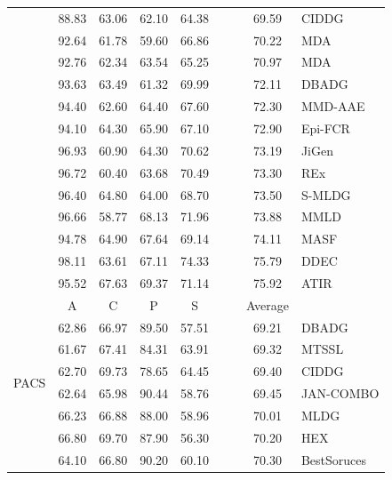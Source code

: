 \documentclass{article}
\begin{document}
\begin{table}
\begin{center}
\begin{small}
{\begin{tabular}{p{1.5cm}cccccccl}
& 88.83 & 63.06 & 62.10 & 64.38 &       &       & 69.59 & CIDDG \citep{li2018deep}\\
& 92.64 & 61.78 & 59.60 & 66.86 &       &       & 70.22 & MDA \citep{hu2019domain}\\
& 92.76 & 62.34 & 63.54 & 65.25 &       &       & 70.97 & MDA \citep{ding2017deep}\\
& 93.63 & 63.49 & 61.32 & 69.99 &       &       & 72.11 & DBADG \citep{Li_2017_ICCV}\\
& 94.40 & 62.60 & 64.40 & 67.60 &       &       & 72.30 & MMD-AAE \citep{li2018domain}\\
& 94.10 & 64.30 & 65.90 & 67.10 &       &       & 72.90 & Epi-FCR \citep{li2019episodic}\\
& 96.93 & 60.90 & 64.30 & 70.62 &       &       & 73.19 & JiGen \citep{carlucci2019domain}\\
& 96.72 & 60.40 & 63.68 & 70.49 &       &       & 73.30 & REx \citep{krueger2020out}\\
& 96.40 & 64.80 & 64.00 & 68.70 &       &       & 73.50 & S-MLDG \citep{li2020sequential}\\
& 96.66 & 58.77 & 68.13 & 71.96 &       &       & 73.88 & MMLD \citep{matsuura2019domain}\\
& 94.78 & 64.90 & 67.64 & 69.14 &       &       & 74.11 & MASF \citep{dou2019domain}\\
& 98.11 & 63.61 & 67.11 & 74.33 &       &       & 75.79 & DDEC \citep{asadi2019towards}\\
& 95.52 & 67.63 & 69.37 & 71.14 &       &       & 75.92 & ATIR \citep{albuquerque2019a}\\
\midrule
\multirow{20}{*}{PACS}%
&     A &     C &     P &     S &       &       & Average & \\
& 62.86 & 66.97 & 89.50 & 57.51 &       &       & 69.21 & DBADG \citep{Li_2017_ICCV}\\
& 61.67 & 67.41 & 84.31 & 63.91 &       &       & 69.32 & MTSSL \citep{albuquerque2020i}\\
& 62.70 & 69.73 & 78.65 & 64.45 &       &       & 69.40 & CIDDG \citep{li2018deep}\\
& 62.64 & 65.98 & 90.44 & 58.76 &       &       & 69.45 & JAN-COMBO \citep{rahman2019multi}\\
& 66.23 & 66.88 & 88.00 & 58.96 &       &       & 70.01 & MLDG \citep{li2018learning}\\
& 66.80 & 69.70 & 87.90 & 56.30 &       &       & 70.20 & HEX \citep{wang2019learning}\\
& 64.10 & 66.80 & 90.20 & 60.10 &       &       & 70.30 & BestSoruces \citep{mancini2018best}\\

\end{tabular}}
\end{small}
\end{center}
\end{table}
\end{document}
